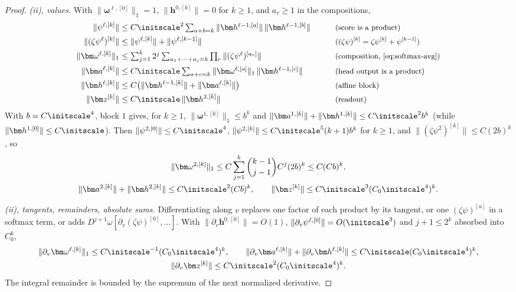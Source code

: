 \begin{proof}
\emph{(ii), values.} With $\|\bm\omega^{\ell,[0]}\|_1=1$, $\|\bm h^{0,[k]}\|=0$ for $k\ge1$, and $a_r\ge1$ in the compositions,
\begin{alignat*}{2}
 \|\psi^{\ell,[k]}\|&\le C\initscale^2\textstyle\sum_{a+b=k}\|\bm h^{\ell-1,[a]}\|\,\|\bm h^{\ell-1,[b]}\| &\qquad& \why{score is a product}\\
 \|(\zeta\psi^\ell)^{[k]}\|&\le\|\psi^{\ell,[k]}\|+\|\psi^{\ell,[k-1]}\| && \why{$(\zeta\psi)^{[k]}=\zeta\psi^{[k]}+\psi^{[k-1]}$}\\
 \|\bm\omega^{\ell,[k]}\|_1&\le\textstyle\sum_{j=1}^k2^j\sum_{a_1+\cdots+a_j=k}\prod_r\|(\zeta\psi^\ell)^{[a_r]}\| && \why{composition, \cref{eq:softmax-avg}}\\
 \|\bm a^{\ell,[k]}\|&\le C\initscale\textstyle\sum_{a+c=k}\|\bm\omega^{\ell,[a]}\|_1\,\|\bm h^{\ell-1,[c]}\| && \why{head output is a product}\\
 \|\bm h^{\ell,[k]}\|&\le C\bigl(\|\bm h^{\ell-1,[k]}\|+\|\bm a^{\ell,[k]}\|\bigr) && \why{affine block}\\
 \|\bm z^{[k]}\|&\le C\initscale\,\|\bm h^{2,[k]}\| && \why{readout}
\end{alignat*}
With $b=C\initscale^4$, block $1$ gives, for $k\ge1$, $\|\bm\omega^{1,[k]}\|_1\le b^k$ and $\|\bm a^{1,[k]}\|+\|\bm h^{1,[k]}\|\le C\initscale^2b^k$ (while $\|\bm h^{1,[0]}\|\le C\initscale$). Then $\|\psi^{2,[0]}\|\le C\initscale^4$,
$\|\psi^{2,[k]}\|\le C\initscale^5(k+1)b^k$ for $k\ge1$, and $\|(\zeta\psi^2)^{[k]}\|\le C(2b)^k$, so
\begin{gather*}
 \|\bm\omega^{2,[k]}\|_1\le C\sum_{j=1}^k\binom{k-1}{j-1}C^j(2b)^k\le C(Cb)^k,\\
 \|\bm a^{2,[k]}\|+\|\bm h^{2,[k]}\|\le C\initscale^2(Cb)^k,\qquad \|\bm z^{[k]}\|\le C\initscale^3(C_0\initscale^4)^k .
\end{gather*}

\emph{(ii), tangents, remainders, absolute sums.} Differentiating along $v$ replaces one factor of each product by its tangent, or one
$(\zeta\psi)^{[a]}$ in a softmax term, or adds $D^{j+1}\omega[\partial_v(\zeta\psi)^{[0]},\ldots]$. With $\|\partial_v\bm h^{0,[0]}\|=O(1)$, $\|\partial_v\psi^{\ell,[0]}\|=O(\initscale^3)$
and $j+1\le2^k$ absorbed into $C_0^k$,
\begin{gather*}
 \|\partial_v\bm\omega^{\ell,[k]}\|_1\le C\initscale^{-1}(C_0\initscale^4)^k,\qquad \|\partial_v\bm a^{\ell,[k]}\|+\|\partial_v\bm h^{\ell,[k]}\|\le C\initscale(C_0\initscale^4)^k,\\
 \|\partial_v\bm z^{[k]}\|\le C\initscale^2(C_0\initscale^4)^k .
\end{gather*}
The integral remainder is bounded by the supremum of the next normalized derivative.


\end{proof}
